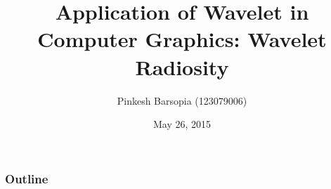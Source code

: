 \documentclass{beamer}
\begin{document}
\title{Application of Wavelet in Computer Graphics: Wavelet Radiosity}  
\author{Pinkesh Barsopia (123079006) }
\date{May 26, 2015}


\begin{frame}
\titlepage
\end{frame}
\begin{frame}[shrink]\frametitle{Outline}
\tableofcontents
\end{frame} 


\end{document}
